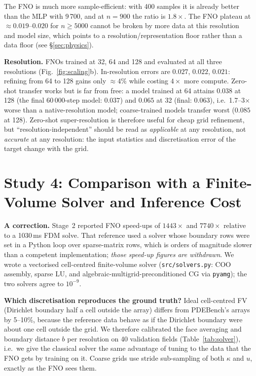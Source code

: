 \documentclass[11pt,a4paper]{article}
\begin{document}
The FNO is much more sample-efficient: with 400 samples it is already better than the MLP with 9\,700, and at $n=900$ the ratio is $1.8\times$. The FNO plateau at $\approx0.019$--$0.020$ for $n\ge5000$ cannot be broken by more data at this resolution and model size, which points to a resolution/representation floor rather than a data floor (see \S\ref{sec:physics}).

\textbf{Resolution.} FNOs trained at 32, 64 and 128 and evaluated at all three resolutions (Fig.~\ref{fig:scaling}b). In-resolution errors are $0.027$, $0.022$, $0.021$: refining from 64 to 128 gains only $\approx4\%$ while costing $4\times$ more compute. Zero-shot transfer works but is far from free: a model trained at 64 attains $0.038$ at 128 (the final 60\,000-step model: $0.037$) and $0.065$ at 32 (final: $0.063$), i.e.\ 1.7--3$\times$ worse than a native-resolution model; coarse-trained models transfer worst ($0.085$ at 128). Zero-shot super-resolution is therefore useful for cheap grid refinement, but ``resolution-independent'' should be read as \emph{applicable} at any resolution, not \emph{accurate} at any resolution: the input statistics and discretisation error of the target change with the grid.

\section{Study 4: Comparison with a Finite-Volume Solver and Inference Cost}\label{sec:solver}
\textbf{A correction.} Stage~2 reported FNO speed-ups of $1443\times$ and $7740\times$ relative to a 1030\,ms FDM solve. That reference used a solver whose boundary rows were set in a Python loop over sparse-matrix rows, which is orders of magnitude slower than a competent implementation; \emph{those speed-up figures are withdrawn}. We wrote a vectorised cell-centred finite-volume solver (\texttt{src/solvers.py}: COO assembly, sparse LU, and algebraic-multigrid-preconditioned CG via \texttt{pyamg}); the two solvers agree to $10^{-9}$.

\textbf{Which discretisation reproduces the ground truth?} Ideal cell-centred FV (Dirichlet boundary half a cell outside the array) differs from PDEBench's arrays by 5--10\%, because the reference data behave as if the Dirichlet boundary were about one cell outside the grid. We therefore calibrated the face averaging and boundary distance $b$ per resolution on 40 validation fields (Table~\ref{tab:solver}), i.e.\ we give the classical solver the same advantage of tuning to the data that the FNO gets by training on it. Coarse grids use stride sub-sampling of both $\kappa$ and $u$, exactly as the FNO sees them.
\end{document}

